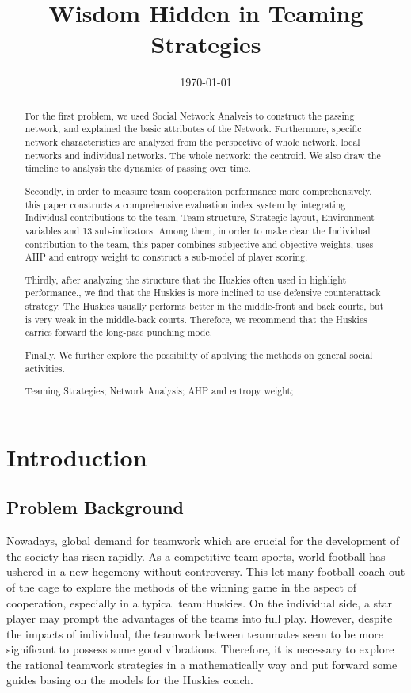 \documentclass{mcmthesis}
\title{Wisdom Hidden in Teaming Strategies}
\date{\today}
\begin{document}
\begin{abstract}
        For the first problem, we used Social Network Analysis to construct the passing network,
        and explained the basic attributes of the Network. Furthermore, specific network characteristics
        are analyzed from the perspective of whole network, local networks and individual networks.
        The whole network: the centroid. We also draw the timeline to
        analysis the dynamics of passing over time.

        Secondly, in order to measure team cooperation performance more comprehensively, this paper
        constructs a comprehensive evaluation index system by integrating Individual contributions to
        the team, Team structure, Strategic layout, Environment variables and 13 sub-indicators. Among
        them, in order to make clear the Individual contribution to the team, this paper combines
        subjective and objective weights, uses AHP and entropy weight to construct a sub-model of
        player scoring.

        Thirdly, after analyzing the structure that the Huskies often used in highlight
        performance., we find that the Huskies is more inclined to use defensive counterattack
        strategy. The Huskies usually performs better in the middle-front and back courts, but
        is very weak in the middle-back courts. Therefore, we recommend that the Huskies
        carries forward the long-pass punching mode.

        Finally, We further explore the possibility of applying
        the methods on general social activities.

        \begin{keywords}
                Teaming Strategies; Network Analysis; AHP and entropy weight;
        \end{keywords}
\end{abstract}
\maketitle
\tableofcontents
\newpage

\section{Introduction}
\subsection{Problem Background}
Nowadays, global demand for teamwork which are crucial for the development of the society has risen rapidly. As a competitive team sports, world football has ushered in a new hegemony without controversy. This let many football coach out of the cage to explore the methods of the winning game in the aspect of cooperation, especially in a typical team:Huskies. On the individual side, a star player may prompt the advantages of the teams into full play. However, despite the impacts of individual, the teamwork between teammates seem to be more significant to possess some good vibrations. Therefore, it is necessary to explore the rational teamwork strategies in a mathematically way and put forward some guides basing on the models for the Huskies coach.
\end{document}
